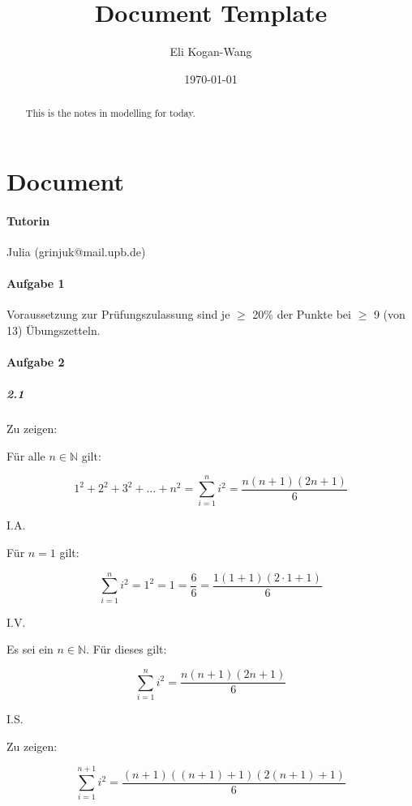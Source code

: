 \documentclass[a4paper,12pt]{article}
\title{Document Template}
\author{Eli Kogan-Wang}
\date{\today}
\begin{document}
\renewcommand{\abstractname}{Abstract}
\begin{abstract}
    This is the notes in modelling for today.
\end{abstract}
\section{Document}

\paragraph{Tutorin} Julia (grinjuk@mail.upb.de)

\paragraph{Aufgabe 1}

Voraussetzung zur Prüfungszulassung sind je $\ge$ 20\% der Punkte bei $\ge$ 9 (von 13) Übungszetteln.

\paragraph{Aufgabe 2}

\subparagraph{2.1}

Zu zeigen:

Für alle $n\in\mathbb{N}$ gilt:

$$1^2+2^2+3^2+\dots+n^2=\sum_{i=1}^n i^2=\frac{n(n+1)(2n+1)}{6}$$

I.A.

Für $n=1$ gilt:

$$\sum_{i=1}^n i^2=1^2=1=\frac{6}{6}=\frac{1(1+1)(2\cdot 1+1)}{6}$$

I.V.

Es sei ein $n\in\mathbb{N}$. Für dieses gilt:

$$\sum_{i=1}^n i^2=\frac{n(n+1)(2n+1)}{6}$$

I.S.

Zu zeigen:

$$\sum_{i=1}^{n+1} i^2=\frac{(n+1)((n+1)+1)(2(n+1)+1)}{6}$$
\end{document}
